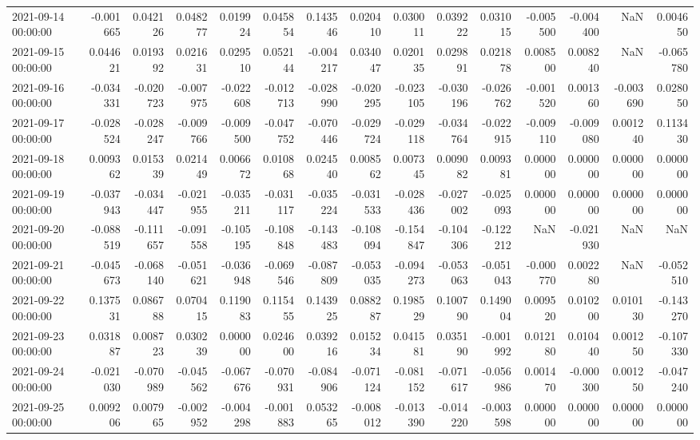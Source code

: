 \begin{tabular}{lrrrrrrrrrrrrrr}
2021-09-14 00:00:00 & -0.001665 & 0.042126 & 0.048277 & 0.019924 & 0.045854 & 0.143546 & 0.020410 & 0.030011 & 0.039222 & 0.031015 & -0.005500 & -0.004400 & NaN & 0.004650 \\
2021-09-15 00:00:00 & 0.044621 & 0.019392 & 0.021631 & 0.029510 & 0.052144 & -0.004217 & 0.034047 & 0.020135 & 0.029891 & 0.021878 & 0.008500 & 0.008240 & NaN & -0.065780 \\
2021-09-16 00:00:00 & -0.034331 & -0.020723 & -0.007975 & -0.022608 & -0.012713 & -0.028990 & -0.020295 & -0.023105 & -0.030196 & -0.026762 & -0.001520 & 0.001360 & -0.003690 & 0.028050 \\
2021-09-17 00:00:00 & -0.028524 & -0.028247 & -0.009766 & -0.009500 & -0.047752 & -0.070446 & -0.029724 & -0.029118 & -0.034764 & -0.022915 & -0.009110 & -0.009080 & 0.001240 & 0.113430 \\
2021-09-18 00:00:00 & 0.009362 & 0.015339 & 0.021449 & 0.006672 & 0.010868 & 0.024540 & 0.008562 & 0.007345 & 0.009082 & 0.009381 & 0.000000 & 0.000000 & 0.000000 & 0.000000 \\
2021-09-19 00:00:00 & -0.037943 & -0.034447 & -0.021955 & -0.035211 & -0.031117 & -0.035224 & -0.031533 & -0.028436 & -0.027002 & -0.025093 & 0.000000 & 0.000000 & 0.000000 & 0.000000 \\
2021-09-20 00:00:00 & -0.088519 & -0.111657 & -0.091558 & -0.105195 & -0.108848 & -0.143483 & -0.108094 & -0.154847 & -0.104306 & -0.122212 & NaN & -0.021930 & NaN & NaN \\
2021-09-21 00:00:00 & -0.045673 & -0.068140 & -0.051621 & -0.036948 & -0.069546 & -0.087809 & -0.053035 & -0.094273 & -0.053063 & -0.051043 & -0.000770 & 0.002280 & NaN & -0.052510 \\
2021-09-22 00:00:00 & 0.137531 & 0.086788 & 0.070415 & 0.119083 & 0.115455 & 0.143925 & 0.088287 & 0.198529 & 0.100790 & 0.149004 & 0.009520 & 0.010200 & 0.010130 & -0.143270 \\
2021-09-23 00:00:00 & 0.031887 & 0.008723 & 0.030239 & 0.000000 & 0.024600 & 0.039216 & 0.015234 & 0.041581 & 0.035190 & -0.001992 & 0.012180 & 0.010440 & 0.001250 & -0.107330 \\
2021-09-24 00:00:00 & -0.021030 & -0.070989 & -0.045562 & -0.067676 & -0.070931 & -0.084906 & -0.071124 & -0.081152 & -0.071617 & -0.056986 & 0.001470 & -0.000300 & 0.001250 & -0.047240 \\
2021-09-25 00:00:00 & 0.009206 & 0.007965 & -0.002952 & -0.004298 & -0.001883 & 0.053265 & -0.008012 & -0.013390 & -0.014220 & -0.003598 & 0.000000 & 0.000000 & 0.000000 & 0.000000 \\

\end{tabular}
